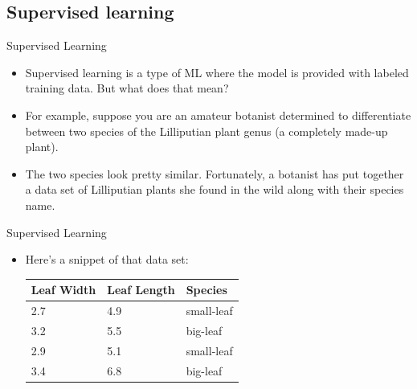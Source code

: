 \documentclass{beamer}
\begin{document}

\subsection{Supervised learning}

\begin{frame}{Supervised Learning}

\begin{itemize}
\item Supervised learning is a type of ML where the model is provided with labeled training data. But what does that mean?

\item For example, suppose you are an amateur botanist determined to differentiate between two species of the Lilliputian plant genus (a completely made-up plant). 

\item The two species look pretty similar. Fortunately, a botanist has put together a data set of Lilliputian plants she found in the wild along with their species name.

\end{itemize}

\end{frame}


\begin{frame}{Supervised Learning}

\begin{itemize}
\item Here's a snippet of that data set:

\bigskip
\begin{tabular}{lll}
Leaf Width & Leaf Length & Species \\ \hline
2.7	& 4.9 & small-leaf \\
3.2	& 5.5 & big-leaf \\
2.9	& 5.1 & small-leaf \\
3.4	& 6.8 & big-leaf 
\end{tabular}

\end{itemize}

\end{frame}

\end{document}
